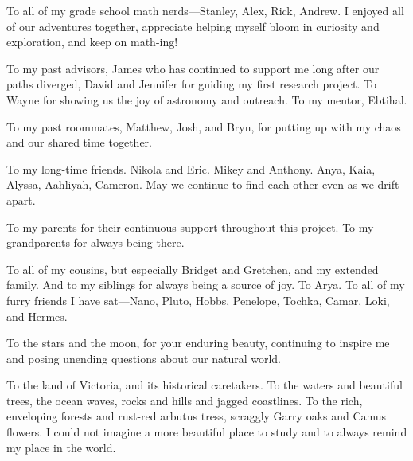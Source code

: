 To all of my grade school math nerds---Stanley, Alex, Rick, Andrew. I
enjoyed all of our adventures together, appreciate helping myself bloom
in curiosity and exploration, and keep on math-ing!

To my past advisors, James who has continued to support me long after
our paths diverged, David and Jennifer for guiding my first research
project. To Wayne for showing us the joy of astronomy and outreach. To
my mentor, Ebtihal.

To my past roommates, Matthew, Josh, and Bryn, for putting up with my
chaos and our shared time together.

To my long-time friends. Nikola and Eric. Mikey and Anthony. Anya, Kaia,
Alyssa, Aahliyah, Cameron. May we continue to find each other even as we
drift apart.

To my parents for their continuous support throughout this project. To
my grandparents for always being there.

To all of my cousins, but especially Bridget and Gretchen, and my
extended family. And to my siblings for always being a source of joy. To
Arya. To all of my furry friends I have sat---Nano, Pluto, Hobbs,
Penelope, Tochka, Camar, Loki, and Hermes.

To the stars and the moon, for your enduring beauty, continuing to
inspire me and posing unending questions about our natural world.

To the land of Victoria, and its historical caretakers. To the waters
and beautiful trees, the ocean waves, rocks and hills and jagged
coastlines. To the rich, enveloping forests and rust-red arbutus tress,
scraggly Garry oaks and Camus flowers. I could not imagine a more
beautiful place to study and to always remind my place in the world.
